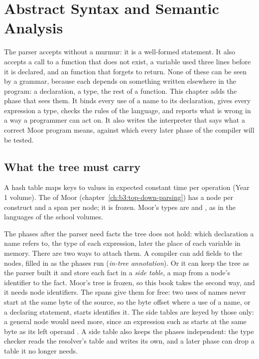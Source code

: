 \chapter{Abstract Syntax and Semantic Analysis}\label{ch:b3:semantic-analysis}

The parser accepts  without a murmur: it is a well-formed statement. It also accepts a call to a function that does not exist, a variable used three lines before it is declared, and an  function that forgets to return. None of these can be seen by a grammar, because each depends on something written elsewhere in the program: a declaration, a type, the rest of a function. This chapter adds the phase that sees them. It binds every use of a name to its declaration, gives every expression a type, checks the rules of the language, and reports what is wrong in a way a programmer can act on. It also writes the interpreter that says what a correct Moor program means, against which every later phase of the compiler will be tested.

\section{What the tree must carry}\label{sec:b3:semantic-analysis:tree}

\begin{recall}
A hash table maps keys to values in expected constant time per operation (Year 1 volume). The  of Moor (chapter~\ref{ch:b3:top-down-parsing}) has a node per construct and a span per node; it is frozen. Moor's types are  and , as in the languages of the school volumes.
\end{recall}

The phases after the parser need facts the tree does not hold: which declaration a name refers to, the type of each expression, later the place of each variable in memory. There are two ways to attach them. A compiler can add fields to the nodes, filled in as the phases run (\emph{in-tree annotation}). Or it can keep the tree as the parser built it and store each fact in a \emph{side table}, a map from a node's identifier to the fact. Moor's tree is frozen, so this book takes the second way, and it needs node identifiers. The spans give them for free: two uses of names never start at the same byte of the source, so the byte offset where a use of a name, or a declaring statement, starts identifies it. The side tables are keyed by those only: a general node would need more, since an expression such as  starts at the same byte as its left operand . A side table also keeps the phases independent: the type checker reads the resolver's table and writes its own, and a later phase can drop a table it no longer needs.

